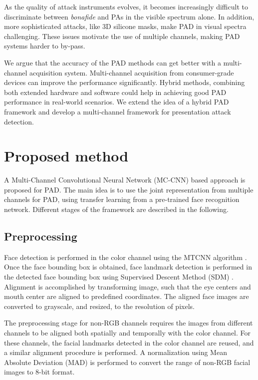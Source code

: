\documentclass[journal]{IEEEtran}
\begin{document}
As the quality of attack instruments evolves, it becomes increasingly difficult to discriminate between \textit{bonafide} and PAs in the visible spectrum alone. In addition, more sophisticated attacks, like 3D silicone masks, make PAD in visual spectra challenging. These issues motivate the use of multiple channels, making PAD systems harder to by-pass.

We argue that the accuracy of the PAD methods can get better with a multi-channel acquisition system. Multi-channel acquisition from consumer-grade devices can improve the performance significantly. Hybrid methods, combining both extended hardware and software could help in achieving good PAD performance in real-world scenarios. We extend the idea of a hybrid PAD framework and develop a multi-channel framework for presentation attack detection.

\section{Proposed method}

A Multi-Channel Convolutional Neural Network (MC-CNN) based approach is proposed for PAD. The main idea is to use the joint representation from multiple channels for PAD, using transfer learning from a pre-trained face recognition network. Different stages of the framework are described in the following.

\subsection{Preprocessing}

\label{subsec:preprocess}

Face detection is performed in the color channel using the MTCNN algorithm \cite{zhang2016joint}. Once the face bounding box is obtained, face landmark detection is performed in the detected face bounding box using Supervised Descent Method (SDM) \cite{xiong2013supervised}. Alignment is accomplished by transforming image, such that the eye centers and mouth center are aligned to predefined coordinates. The aligned face images are converted to grayscale, and resized, to the resolution of  pixels.

The preprocessing stage for non-RGB channels requires the images from different channels to be aligned both spatially and temporally with the color channel. For these channels, the facial landmarks detected in the color channel are reused, and a similar alignment procedure is performed. A normalization using  Mean Absolute Deviation (MAD) \cite{leys2013detecting} is performed to convert the range of non-RGB facial images to 8-bit format.
\end{document}
